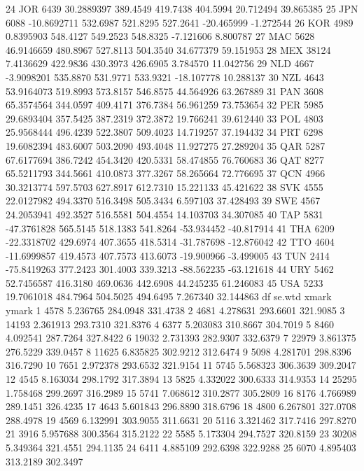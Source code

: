 \documentclass[nojss]{jss}
\begin{document}
\begin{Schunk}
\begin{Soutput}
24    JOR  6439  30.2889397 389.4549 419.7438 404.5994  20.712494  39.865385
25    JPN  6088 -10.8692711 532.6987 521.8295 527.2641 -20.465999  -1.272544
26    KOR  4989   0.8395903 548.4127 549.2523 548.8325  -7.121606   8.800787
27    MAC  5628  46.9146659 480.8967 527.8113 504.3540  34.677379  59.151953
28    MEX 38124   7.4136629 422.9836 430.3973 426.6905   3.784570  11.042756
29    NLD  4667  -3.9098201 535.8870 531.9771 533.9321 -18.107778  10.288137
30    NZL  4643  53.9164073 519.8993 573.8157 546.8575  44.564926  63.267889
31    PAN  3608  65.3574564 344.0597 409.4171 376.7384  56.961259  73.753654
32    PER  5985  29.6893404 357.5425 387.2319 372.3872  19.766241  39.612440
33    POL  4803  25.9568444 496.4239 522.3807 509.4023  14.719257  37.194432
34    PRT  6298  19.6082394 483.6007 503.2090 493.4048  11.927275  27.289204
35    QAR  5287  67.6177694 386.7242 454.3420 420.5331  58.474855  76.760683
36    QAT  8277  65.5211793 344.5661 410.0873 377.3267  58.265664  72.776695
37    QCN  4966  30.3213774 597.5703 627.8917 612.7310  15.221133  45.421622
38    SVK  4555  22.0127982 494.3370 516.3498 505.3434   6.597103  37.428493
39    SWE  4567  24.2053941 492.3527 516.5581 504.4554  14.103703  34.307085
40    TAP  5831 -47.3761828 565.5145 518.1383 541.8264 -53.934452 -40.817914
41    THA  6209 -22.3318702 429.6974 407.3655 418.5314 -31.787698 -12.876042
42    TTO  4604 -11.6999857 419.4573 407.7573 413.6073 -19.900966  -3.499005
43    TUN  2414 -75.8419263 377.2423 301.4003 339.3213 -88.562235 -63.121618
44    URY  5462  52.7456587 416.3180 469.0636 442.6908  44.245235  61.246083
45    USA  5233  19.7061018 484.7964 504.5025 494.6495   7.267340  32.144863
      df   se.wtd    xmark    ymark
1   4578 5.236765 284.0948 331.4738
2   4681 4.278631 293.6601 321.9085
3  14193 2.361913 293.7310 321.8376
4   6377 5.203083 310.8667 304.7019
5   8460 4.092541 287.7264 327.8422
6  19032 2.731393 282.9307 332.6379
7  22979 3.861375 276.5229 339.0457
8  11625 6.835825 302.9212 312.6474
9   5098 4.281701 298.8396 316.7290
10  7651 2.972378 293.6532 321.9154
11  5745 5.568323 306.3639 309.2047
12  4545 8.163034 298.1792 317.3894
13  5825 4.332022 300.6333 314.9353
14 25295 1.758468 299.2697 316.2989
15  5741 7.068612 310.2877 305.2809
16  8176 4.766989 289.1451 326.4235
17  4643 5.601843 296.8890 318.6796
18  4800 6.267801 327.0708 288.4978
19  4569 6.132991 303.9055 311.6631
20  5116 3.321462 317.7416 297.8270
21  3916 5.957688 300.3564 315.2122
22  5585 5.173304 294.7527 320.8159
23 30208 5.349364 321.4551 294.1135
24  6411 4.885109 292.6398 322.9288
25  6070 4.895403 313.2189 302.3497

\end{Soutput}
\end{Schunk}
\end{document}
